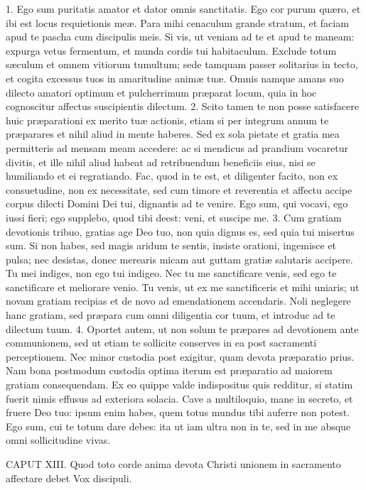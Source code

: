 1. Ego sum puritatis amator et dator omnis sanctitatis. Ego cor purum quæro, et ibi est locus requietionis meæ. Para mihi cenaculum grande stratum, et faciam apud te pascha cum discipulis meis. Si vis, ut veniam ad te et apud te maneam: expurga vetus fermentum, et munda cordis tui habitaculum. Exclude totum sæculum et omnem vitiorum tumultum; sede tamquam passer solitarius in tecto, et cogita excessus tuos in amaritudine animæ tuæ. Omnis namque amans suo dilecto amatori optimum et pulcherrimum præparat locum, quia in hoc cognoscitur affectus suscipientis dilectum.
2. Scito tamen te non posse satisfacere huic præparationi ex merito tuæ actionis, etiam si per integrum annum te præparares et nihil aliud in mente haberes. Sed ex sola pietate et gratia mea permitteris ad mensam meam accedere: ac si mendicus ad prandium vocaretur divitis, et ille nihil aliud habeat ad retribuendum beneficiis eius, nisi se humiliando et ei regratiando. Fac, quod in te est, et diligenter facito, non ex consuetudine, non ex necessitate, sed cum timore et reverentia et affectu accipe corpus dilecti Domini Dei tui, dignantis ad te venire. Ego sum, qui vocavi, ego iussi fieri; ego supplebo, quod tibi deest: veni, et suscipe me.
3. Cum gratiam devotionis tribuo, gratias age Deo tuo, non quia dignus es, sed quia tui misertus sum. Si non habes, sed magis aridum te sentis, insiste orationi, ingemisce et pulsa; nec desistas, donec merearis micam aut guttam gratiæ salutaris accipere. Tu mei indiges, non ego tui indigeo. Nec tu me sanctificare venis, sed ego te sanctificare et meliorare venio. Tu venis, ut ex me sanctificeris et mihi uniaris; ut novam gratiam recipias et de novo ad emendationem accendaris. Noli neglegere hanc gratiam, sed præpara cum omni diligentia cor tuum, et introduc ad te dilectum tuum.
4. Oportet autem, ut non solum te præpares ad devotionem ante communionem, sed ut etiam te sollicite conserves in ea post sacramenti perceptionem. Nec minor custodia post exigitur, quam devota præparatio prius. Nam bona postmodum custodia optima iterum est præparatio ad maiorem gratiam consequendam. Ex eo quippe valde indispositus quis redditur, si statim fuerit nimis effusus ad exteriora solacia. Cave a multiloquio, mane in secreto, et fruere Deo tuo: ipsum enim habes, quem totus mundus tibi auferre non potest. Ego sum, cui te totum dare debes: ita ut iam ultra non in te, sed in me absque omni sollicitudine vivas.


CAPUT XIII.
Quod toto corde anima devota Christi unionem in sacramento affectare debet
Vox discipuli.

